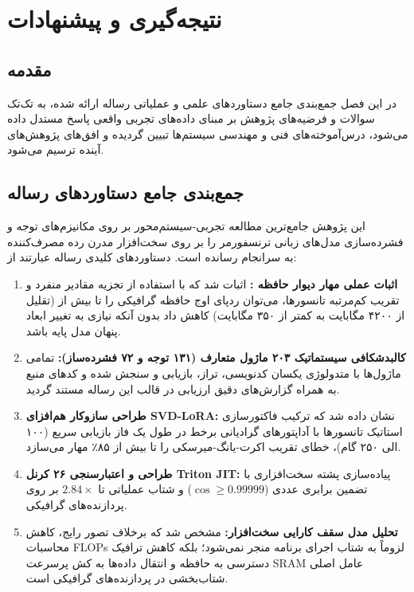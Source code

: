 \documentclass[12pt,a4paper]{report}
\theoremstyle{definition}
\begin{document}
\chapter{نتیجه‌گیری و پیشنهادات}
\label{chap:conclusion}

\section{مقدمه}
در این فصل جمع‌بندی جامع دستاوردهای علمی و عملیاتی رساله ارائه شده، به تک‌تک سوالات و فرضیه‌های پژوهش بر مبنای داده‌های تجربی واقعی پاسخ مستدل داده می‌شود، درس‌آموخته‌های فنی و مهندسی سیستم‌ها تبیین گردیده و افق‌های پژوهش‌های آینده ترسیم می‌شود.

\section{جمع‌بندی جامع دستاوردهای رساله}
این پژوهش جامع‌ترین مطالعه تجربی-سیستم‌محور بر روی مکانیزم‌های توجه و فشرده‌سازی مدل‌های زبانی ترنسفورمر را بر روی سخت‌افزار مدرن رده مصرف‌کننده به سرانجام رسانده است. دستاوردهای کلیدی رساله عبارتند از:
\begin{enumerate}
    \item \textbf{اثبات عملی مهار دیوار حافظه :} اثبات شد که با استفاده از تجزیه مقادیر منفرد و تقریب کم‌مرتبه تانسورها، می‌توان ردپای اوج حافظه گرافیکی را تا بیش از  (تقلیل از ۴۲۰۰ مگابایت به کمتر از ۳۵۰ مگابایت) کاهش داد بدون آنکه نیازی به تغییر ابعاد پنهان مدل پایه باشد.
    \item \textbf{کالبدشکافی سیستماتیک ۲۰۳ ماژول متعارف (۱۳۱ توجه و ۷۲ فشرده‌ساز):} تمامی ماژول‌ها با متدولوژی یکسان کدنویسی، تراز، بازیابی و سنجش شده و کدهای منبع به همراه گزارش‌های دقیق ارزیابی در قالب این رساله مستند گردید.
    \item \textbf{طراحی سازوکار هم‌افزای SVD-LoRA:} نشان داده شد که ترکیب فاکتورسازی استاتیک تانسورها با آداپتورهای گرادیانی برخط در طول یک فاز بازیابی سریع (۱۰۰ الی ۲۵۰ گام)، خطای تقریب اکرت-یانگ-میرسکی را تا بیش از ۸۵٪ مهار می‌سازد.
    \item \textbf{طراحی و اعتبارسنجی ۲۶ کرنل Triton JIT:} پیاده‌سازی پشته سخت‌افزاری با تضمین برابری عددی ($\cos \ge 0.99999$) و شتاب عملیاتی تا $2.84\times$ بر روی پردازنده‌های گرافیکی.
    \item \textbf{تحلیل مدل سقف کارایی سخت‌افزار:} مشخص شد که برخلاف تصور رایج، کاهش محاسبات FLOPs لزوماً به شتاب اجرای برنامه منجر نمی‌شود؛ بلکه کاهش ترافیک دسترسی به حافظه و انتقال داده‌ها به کش پرسرعت SRAM عامل اصلی شتاب‌بخشی در پردازنده‌های گرافیکی است.
\end{enumerate}
\end{document}
